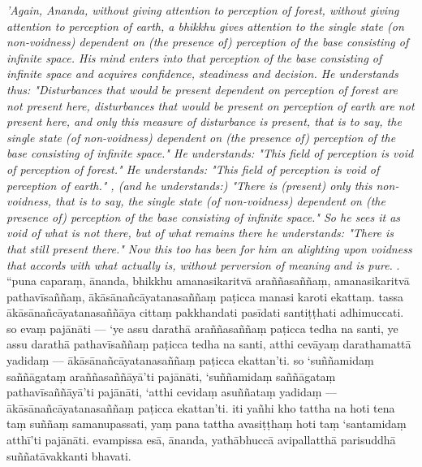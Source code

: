 \documentclass[10pt]{article}
\begin{document}
\begin{paracol}{2}
\begin{column}
{\itshape\footnotesize  'Again, Ananda, without giving attention to perception of forest, without giving attention to perception of earth, a bhikkhu gives attention to the single state (on non-voidness) dependent on (the presence of) perception of the base consisting of infinite space. His mind enters into that perception of the base consisting of infinite space and acquires confidence, steadiness and decision. He understands thus: "Disturbances that would be present dependent on perception of forest are not present here, disturbances that would be present on perception of earth are not present here, and only this measure of disturbance is present, that is to say, the single state (of non-voidness) dependent on (the presence of) perception of the base consisting of infinite space." He understands: "This field of perception is void of perception of forest." He understands: "This field of perception is void of perception of earth." , (and he understands:) "There is (present) only this non-voidness, that is to say, the single state (of non-voidness) dependent on (the presence of) perception of the base consisting of infinite space." So he sees it as void of what is not there, but of what remains there he understands: "There is that still present there." Now this too has been for him an alighting upon voidness that accords with what actually is, without perversion of meaning and is pure.}
. “puna caparaṃ, ānanda, bhikkhu amanasikaritvā araññasaññaṃ, amanasikaritvā pathavīsaññaṃ, ākāsānañcāyatanasaññaṃ paṭicca manasi karoti ekattaṃ. tassa ākāsānañcāyatanasaññāya cittaṃ pakkhandati pasīdati santiṭṭhati adhimuccati. so evaṃ pajānāti — ‘ye assu darathā araññasaññaṃ paṭicca tedha na santi, ye assu darathā pathavīsaññaṃ paṭicca tedha na santi, atthi cevāyaṃ darathamattā yadidaṃ — ākāsānañcāyatanasaññaṃ paṭicca ekattan’ti. so ‘suññamidaṃ saññāgataṃ araññasaññāyā’ti pajānāti, ‘suññamidaṃ saññāgataṃ pathavīsaññāyā’ti pajānāti, ‘atthi cevidaṃ asuññataṃ yadidaṃ — ākāsānañcāyatanasaññaṃ paṭicca ekattan’ti. iti yañhi kho tattha na hoti tena taṃ suññaṃ samanupassati, yaṃ pana tattha avasiṭṭhaṃ hoti taṃ ‘santamidaṃ atthī’ti pajānāti. evampissa esā, ānanda, yathābhuccā avipallatthā parisuddhā suññatāvakkanti bhavati.
\switchcolumn*

\end{column}
\end{paracol}
\end{document}
